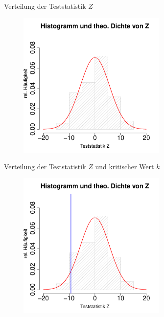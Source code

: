 \documentclass[usenames,dvipsnames,handout]{beamer}
\begin{document}
\begin{frame}{Verteilung der Teststatistik $Z$}
\begin{figure}[ht]
 	\centering
 	      \includegraphics[width=0.65\textwidth]{distZ.pdf}
 	\end{figure}
\end{frame}

\begin{frame}{Verteilung der Teststatistik $Z$ und kritischer Wert $k$}
\begin{figure}[ht]
 	\centering
 	      \includegraphics[width=0.65\textwidth]{distZ2.pdf}
 	\end{figure}
\end{frame}
\end{document}
